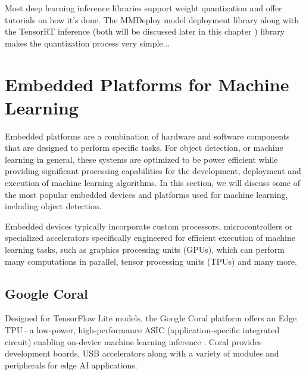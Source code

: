 
Most deep learning inference libraries support weight quantization and offer
tutorials on how it's done. The MMDeploy model deployment library along with the TensorRT
inference (both will be discussed later in this chapter ) library makes
the quantization process very simple...






\section{Embedded Platforms for Machine Learning}

Embedded platforms are a combination of hardware and software components that
are designed to perform specific tasks. For object detection, or machine
learning in general, these systems are optimized to be power efficient while
providing significant processing capabilities for the development, deployment and
execution of machine learning algorithms. In this section, we will discuss some
of the most popular embedded devices and platforms used for machine learning,
including object detection.

Embedded devices typically incorporate custom processors, microcontrollers or
specialized accelerators specifically engineered for efficient execution of
machine learning tasks, such as graphics processing units (GPUs), which can
perform many computations in parallel, tensor processing units (TPUs) and many
more.

\subsection{Google Coral}

Designed for TensorFlow Lite  models, the Google Coral platform
offers an Edge TPU\,--\,a low-power, high-performance ASIC (application-specific
integrated circuit) enabling on-device machine learning inference . Coral provides development boards, USB
accelerators along with a variety of modules and peripherals for edge AI
applications.


